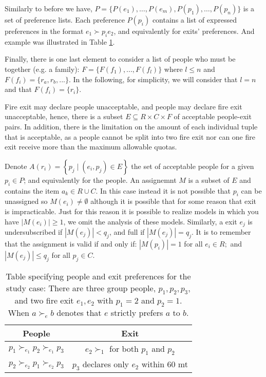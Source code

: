 \documentclass[letterpaper]{article} %
\begin{document}
Similarly to before we have, \(P = \{P(e_1), \dots , P(e_m), P(p_1), \dots , P(p_n)\}\) is
a set of preference lists.
Each preference \(P(p_i)\) contains a list of expressed preferences in the format \( e _ { 1 } \succ p _ { i } e _ { 2 } \),
and equivalently for exits' preferences.
 And example was illustrated in Table \ref{tab:people-exit}.

Finally, there is one last element to consider a list of people who must be together (e.g. a family): \(F=\{F(f_1), ..., F(f_l)\}\) where \(l\leq n\) and \(F(f_i) = \{r_a, r_b, ...\}\).
In the following, for simplicity, we will consider that \(l=n\) and that \(F(f_i)=\{r_i\}\).

Fire exit may declare people unacceptable, and people may declare fire exit unacceptable,
hence, there is a subset \(E \subseteq R \times C \times F\) of acceptable people-exit pairs.
In addition, there is the limitation on the amount of each individual tuple that is acceptable, as a people cannot be split into two fire exit nor can one fire exit receive more than the maximum allowable quotas.

Denote \( A \left( r _ { i } \right) = \left\{ p _ { j } \mid \left( e _ { i } , p _ { j } \right) \in E \right\} \)
the set of acceptable people for a given \( p _ { i } \in P \); and equivalently for the people.
An assignemnt \(M\) is a subset of \(E\) and contains the item \( a _ { k } \in R \cup C \). In this case instead it is not possible that \( p _ { i } \) can be unassigned so \( M \left( e _ { i } \right) \neq \emptyset \) although it is possible that for some reason that exit is impracticable.
Just for this reason it is possible to realize models in which you have \(|M \left( e _ { i } \right)| \geq 1\), we omit the analysis of these models.
Similarly, a exit \( e _ { j } \) is
undersubscribed if \( \left| M \left( e _ { j } \right) \right| < q _ { j } \), and full if \( \left| M \left( e _ { j } \right) \right| = q _ { j } \).
It is to remember that the assignment is valid if and only if:
\( \left| M \left( p _ { i } \right) \right| = 1 \) for all \( e _ { i } \in R ; \) and
\( \left| M \left( e _ { j } \right) \right| \leq q _ { j } \) for all \( p _ { j } \in C  \).

\begin{table}[!htb]
    \begin{tabular}{c|c}
        \hline People & Exit \\
        \hline\( p_{1} \succ_{e_{1}} p_{2} \succ_{e_{1}} p_{3} \) & \( e_{2} \succ_{1} \) for both \( p_{1} \) and \( p_{2} \) \\
        \( p_{2} \succ_{e_{2}} p_{1} \succ_{e_{2}} p_{3} \) & \( p_{3} \) declares only \( e_{2} \) within 60 mt \\
        \hline
    \end{tabular}
    \caption{Table specifying people and exit preferences for
    the study case: There are three group people, \( p _ { 1 } , p _ { 2 } , p _ { 3 } \), and two fire exit \( e _ { 1 } , e _ { 2 } \) with \( p _ { 1 } = 2 \) and \( p _ { 2 } = 1 \).
    When \( a \succ_{e} b \) denotes that \( e \) strictly prefers \( a \) to \( b \).}
    \label{tab:people-exit}
\end{table}
\end{document}
